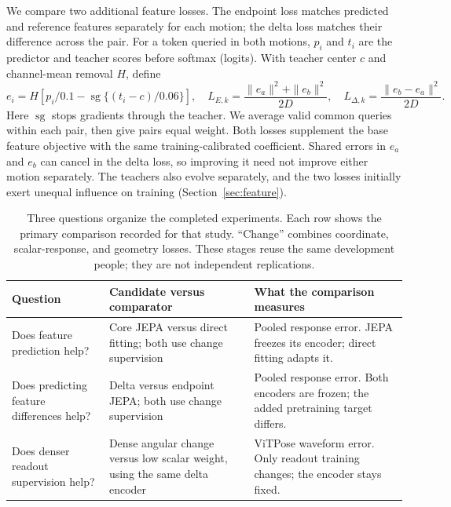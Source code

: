\documentclass{article}
\newcommand{\sg}{\operatorname{sg}}
\begin{document}
We compare two additional feature losses. The endpoint loss matches predicted and reference features separately for each motion; the delta loss matches their difference across the pair. For a token queried in both motions, $p_i$ and $t_i$ are the predictor and teacher scores before softmax (logits). With teacher center $c$ and channel-mean removal $H$, define
\begin{equation}
e_i=H[p_i/0.1-\sg\{(t_i-c)/0.06\}],\quad
L_{E,k}=\frac{\|e_a\|^2+\|e_b\|^2}{2D},\quad
L_{\Delta,k}=\frac{\|e_b-e_a\|^2}{2D}.
\label{eq:feature}
\end{equation}
Here $\sg$ stops gradients through the teacher. We average valid common queries within each pair, then give pairs equal weight. Both losses supplement the base feature objective with the same training-calibrated coefficient. Shared errors in $e_a$ and $e_b$ can cancel in the delta loss, so improving it need not improve either motion separately. The teachers also evolve separately, and the two losses initially exert unequal influence on training (Section~\ref{sec:feature}).

\begin{table}[t]\centering\small
\caption{Three questions organize the completed experiments. Each row shows the primary comparison recorded for that study. ``Change'' combines coordinate, scalar-response, and geometry losses. These stages reuse the same development people; they are not independent replications.}
\label{tab:design}
\setlength{\tabcolsep}{3pt}
\begin{tabular}{>{\raggedright\arraybackslash}p{1.36in}>{\raggedright\arraybackslash}p{1.78in}>{\raggedright\arraybackslash}p{2.04in}}\toprule
Question & Candidate versus comparator & What the comparison measures \\\midrule
Does feature prediction help? & Core JEPA versus direct fitting; both use change supervision & Pooled response error. JEPA freezes its encoder; direct fitting adapts it. \\
Does predicting feature differences help? & Delta versus endpoint JEPA; both use change supervision & Pooled response error. Both encoders are frozen; the added pretraining target differs. \\
Does denser readout supervision help? & Dense angular change versus low scalar weight, using the same delta encoder & ViTPose waveform error. Only readout training changes; the encoder stays fixed. \\\bottomrule
\end{tabular}
\end{table}
\end{document}
